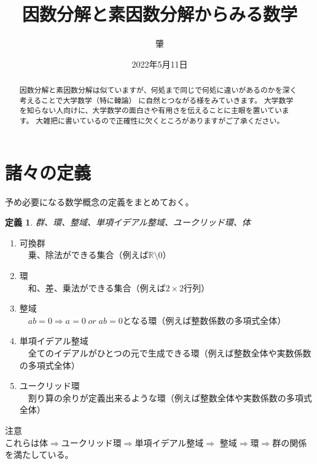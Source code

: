 \documentclass{jsarticle}
\title{因数分解と素因数分解からみる数学}
\author{肇}
\date{2022年5月11日}
\newtheorem{definition}{定義}
\begin{document}
\maketitle
\begin{abstract}
    因数分解と素因数分解は似ていますが、何処まで同じで何処に違いがあるのかを深く考えることで大学数学（特に韓論）
    に自然とつながる様をみていきます。
    大学数学を知らない人向けに、大学数学の面白さや有用さを伝えることに主眼を置いています。
    大雑把に書いているので正確性に欠くところがありますがご了承ください。
\end{abstract}
\section{諸々の定義}
予め必要になる数学概念の定義をまとめておく。
\begin{definition}
    群、環、整域、単項イデアル整域、ユークリッド環、体
\end{definition}
\begin{enumerate}
    \item 可換群\\　乗、除法ができる集合（例えば$\mathbb{R}\setminus{0}$）
    \item 環\\　和、差、乗法ができる集合（例えば$2\times 2$行列）
    \item 整域\\　$ab=0\Rightarrow a=0 \;or\;a b=0$となる環（例えば整数係数の多項式全体）
    \item 単項イデアル整域\\　全てのイデアルがひとつの元で生成できる環（例えば整数全体や実数係数の多項式全体）
    \item ユークリッド環\\　割り算の余りが定義出来るような環（例えば整数全体や実数係数の多項式全体）
\end{enumerate}
注意\\
これらは体$\Rightarrow$ユークリッド環$\Rightarrow$単項イデアル整域$\Rightarrow$
整域$\Rightarrow$環$\Rightarrow$群の関係を満たしている。
\end{document}
